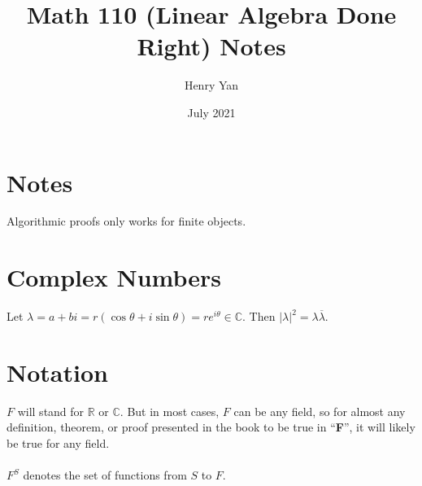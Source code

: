 \documentclass{article}
\title{Math 110 (Linear Algebra Done Right) Notes}
\author{Henry Yan}
\date{July 2021}
\theoremstyle{definition}
\begin{document}
\maketitle

\section*{Notes}
Algorithmic proofs only works for finite objects. 
\section*{Complex Numbers}
Let $\lambda = a + bi = r(\cos\theta + i\sin\theta) = re^{i\theta} \in \mathbb{C}.$ Then $|\lambda|^2 = \lambda \overline{\lambda}$.
\section*{Notation}
$F$ will stand for $\mathbb{R}$ or $\mathbb{C}$. But in most cases, $F$ can be any field, so for almost any definition, theorem, or proof presented in the book to be true in ``\textbf{F}'', it will likely be true for any field. \\ \\
$F^S$ denotes the set of functions from $S$ to $F$.
\end{document}
